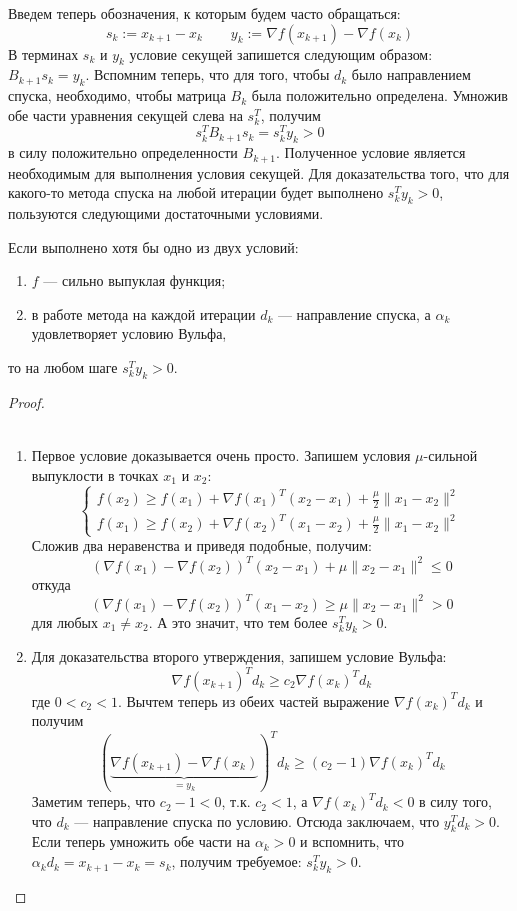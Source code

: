 \documentclass[a4paper, 12pt]{article}
\begin{document}
Введем теперь обозначения, к которым будем часто обращаться:
$$
s_k := x_{k+1} - x_k \qquad y_k := \nabla f(x_{k+1}) - \nabla f(x_k)
$$
В терминах $s_k$ и $y_k$ условие секущей запишется следующим образом: $B_{k+1}s_k = y_k$. Вспомним теперь, что для того, чтобы $d_k$ было направлением спуска, необходимо, чтобы матрица $B_k$ была положительно определена. Умножив обе части уравнения секущей слева на $s_k^T$, получим
$$s_k^T B_{k+1} s_k = s_k^Ty_k > 0$$
в силу положительно определенности $B_{k+1}$. Полученное условие является необходимым для выполнения условия секущей. Для доказательства того, что для какого-то метода спуска на любой итерации будет выполнено $s_k^Ty_k > 0$, пользуются следующими достаточными условиями.

\begin{Statement}
Если выполнено хотя бы одно из двух условий:
\begin{enumerate}
    \item $f$ --- сильно выпуклая функция;
    \item в работе метода на каждой итерации $d_k$ --- направление спуска, а $\alpha_k$ удовлетворяет условию Вульфа,
\end{enumerate}
то на любом шаге $s_k^Ty_k > 0$.
\end{Statement}
\begin{proof}
\\~

\begin{enumerate}
    \item Первое условие доказывается очень просто. Запишем условия $\mu$-сильной выпуклости в точках $x_1$ и $x_2$:
$$
\begin{cases}
f(x_2) \geq f(x_1) + \nabla f(x_1)^T (x_2 - x_1) + \frac{\mu}{2}\|x_1 - x_2\|^2 \\
f(x_1) \geq f(x_2) + \nabla f(x_2)^T (x_1 - x_2) + \frac{\mu}{2}\|x_1 - x_2\|^2
\end{cases}
$$
Сложив два неравенства и приведя подобные, получим:
$$\left(\nabla f(x_1) - \nabla f(x_2)\right)^T(x_2 - x_1) + \mu \|x_2 - x_1\|^2 \leq 0$$
откуда
$$\left(\nabla f(x_1) - \nabla f(x_2)\right)^T(x_1 - x_2) \geq \mu \|x_2 - x_1\|^2 > 0$$ для любых $x_1 \neq x_2$. А это значит, что тем более $s_k^Ty_k > 0$.

\item Для доказательства второго утверждения, запишем условие Вульфа:
$$\nabla f(x_{k+1})^T d_k \geq c_2 \nabla f(x_k)^Td_k$$
где $0 < c_2 < 1$. Вычтем теперь из обеих частей выражение $\nabla f(x_k)^T d_k$ и получим
$$\left(\underbrace{\nabla f(x_{k+1}) - \nabla f(x_k)}_{=y_k}\right)^Td_k \geq (c_2 - 1)\nabla f(x_k)^Td_k$$
Заметим теперь, что $c_2 - 1 < 0$, т.к. $c_2 < 1$, а $\nabla f(x_k)^Td_k < 0$ в силу того, что $d_k$ --- направление спуска по условию. Отсюда заключаем, что $y_k^Td_k > 0$. Если теперь умножить обе части на $\alpha_k > 0$ и вспомнить, что $\alpha_kd_k = x_{k+1} - x_k = s_k$, получим требуемое: $s_k^Ty_k > 0$.

\end{enumerate}
\end{proof}
\end{document}
